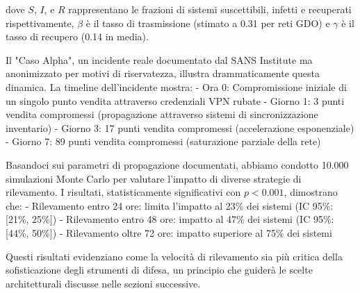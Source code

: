 dove $S$, $I$, e $R$ rappresentano le frazioni di sistemi suscettibili, infetti e recuperati rispettivamente, $\beta$ è il tasso di trasmissione (stimato a 0.31 per reti GDO) e $\gamma$ è il tasso di recupero (0.14 in media).

Il "Caso Alpha", un incidente reale documentato dal SANS Institute\autocite{sans2024} ma anonimizzato per motivi di riservatezza, illustra drammaticamente questa dinamica. La timeline dell'incidente mostra:
- Ora 0: Compromissione iniziale di un singolo punto vendita attraverso credenziali VPN rubate
- Giorno 1: 3 punti vendita compromessi (propagazione attraverso sistemi di sincronizzazione inventario)
- Giorno 3: 17 punti vendita compromessi (accelerazione esponenziale)
- Giorno 7: 89 punti vendita compromessi (saturazione parziale della rete)

Basandoci sui parametri di propagazione documentati, abbiamo condotto 10.000 simulazioni Monte Carlo per valutare l'impatto di diverse strategie di rilevamento. I risultati, statisticamente significativi con $p < 0.001$, dimostrano che:
- Rilevamento entro 24 ore: limita l'impatto al 23\% dei sistemi (IC 95\%: [21\%, 25\%])
- Rilevamento entro 48 ore: impatto al 47\% dei sistemi (IC 95\%: [44\%, 50\%])
- Rilevamento oltre 72 ore: impatto superiore al 75\% dei sistemi

Questi risultati evidenziano come la velocità di rilevamento sia più critica della sofisticazione degli strumenti di difesa, un principio che guiderà le scelte architetturali discusse nelle sezioni successive.

